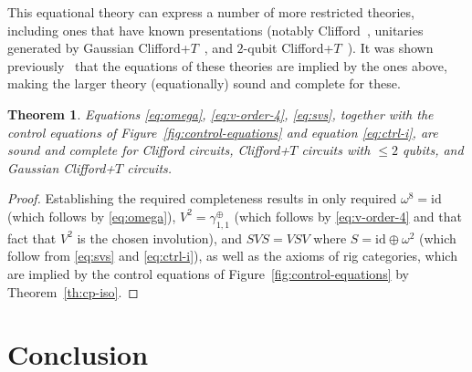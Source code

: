 \documentclass[a4paper]{article}
\theoremstyle{plain}
\newtheorem{theorem}{Theorem}
\theoremstyle{definition}
\newcommand{\symplus}{\gamma^\oplus}
\newcommand{\id}{\mathrm{id}}
\begin{document}
This equational theory can express a number of more restricted
theories, including ones that have known presentations (notably
Clifford~\cite{selinger:clifford}, unitaries generated by Gaussian
Clifford+$T$~\cite{bianselinger:unitaries}, and $2$-qubit
Clifford+$T$~\cite{bianselinger:cliffordt}). It was shown
previously~\cite{carette2024easy,caretteetal:free} that the equations
of these theories are implied by the ones above, making the larger
theory (equationally) sound and complete for these.
\begin{theorem}
 Equations \eqref{eq:omega}, \eqref{eq:v-order-4}, \eqref{eq:svs},
 together with the control equations of
 Figure~\ref{fig:control-equations} and equation
 \eqref{eq:ctrl-i}, are sound and complete for Clifford circuits,
 Clifford+$T$ circuits with $\le 2$ qubits, and Gaussian Clifford+$T$ circuits.
\end{theorem}
\begin{proof}
 Establishing the required completeness results in
 \cite{carette2024easy,caretteetal:free} only required $\omega^8 =
 \id$ (which follows by \eqref{eq:omega}), $V^2 = \symplus_{1,1}$
 (which follows by \eqref{eq:v-order-4} and that fact that $V^2$ is
 the chosen involution), and $SVS = VSV$ where $S = \id \oplus
 \omega^2$ (which follow from \eqref{eq:svs} and \eqref{eq:ctrl-i}),
 as well as the axioms of rig categories, which are implied by the
 control equations of Figure~\ref{fig:control-equations} by
 Theorem~\ref{th:cp-iso}.
\end{proof}

\section{Conclusion}
\label{sec:conclusion}
\end{document}
